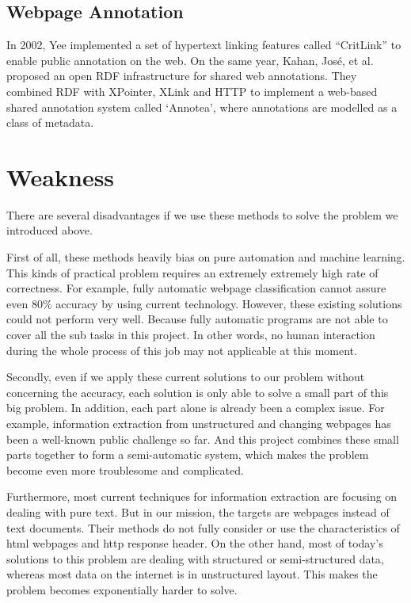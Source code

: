 \subsection{Webpage Annotation}
In 2002, Yee implemented a set of hypertext linking features called “CritLink” to enable public annotation on the web\cite{yee2002critlink}. On the same year, Kahan, José, et al. proposed an open RDF infrastructure for shared web annotations. They combined RDF with XPointer, XLink and HTTP to implement a web-based shared annotation system called `Annotea', where annotations are modelled as a class of metadata\cite{kahan2002annotea}.

\section{Weakness}
There are several disadvantages if we use these methods to solve the problem we introduced above.

First of all, these methods heavily bias on pure automation and machine learning. This kinds of practical problem requires an extremely extremely high rate of correctness. For example, fully automatic webpage classification cannot assure even 80\% accuracy by using current technology. However, these existing solutions could not perform very well. Because fully automatic programs are not able to cover all the sub tasks in this project. In other words, no human interaction during the whole process of this job may not applicable at this moment.

Secondly, even if we apply these current solutions to our problem without concerning the accuracy, each solution is only able to solve a small part of this big problem. In addition, each part alone is already been a complex issue. For example, information extraction from unstructured and changing webpages has been a well-known public challenge so far. And this project combines these small parts together to form a semi-automatic system, which makes the problem become even more troublesome and complicated.

Furthermore, most current techniques for information extraction are focusing on dealing with pure text. But in our mission, the targets are webpages instead of text documents. Their methods do not fully consider or use the characteristics of html webpages and http response header. On the other hand, most of today's solutions to this problem are dealing with structured or semi-structured data, whereas most data on the internet is in unstructured layout. This makes the problem becomes exponentially harder to solve.





